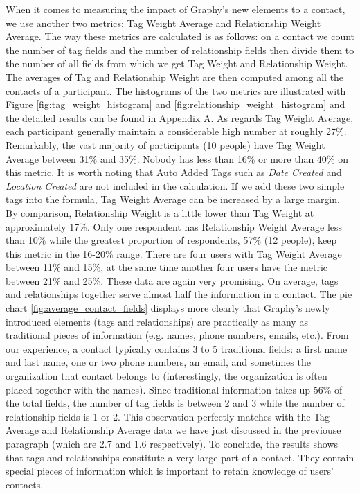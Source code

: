 When it comes to measuring the impact of Graphy's new elements to a contact, we use another two metrics: Tag Weight Average and Relationship Weight Average. The way these metrics are calculated is as follows: on a contact we count the number of tag fields and the number of relationship fields then divide them to the number of all fields from which we get Tag Weight and Relationship Weight. The averages of Tag and Relationship Weight are then computed among all the contacts of a participant. The histograms of the two metrics are illustrated with Figure \ref{fig:tag_weight_histogram} and \ref{fig:relationship_weight_histogram} and the detailed results can be found in Appendix A. As regards Tag Weight Average, each participant generally maintain a considerable high number at roughly 27\%. Remarkably, the vast majority of participants (10 people) have Tag Weight Average between 31\% and 35\%. Nobody has less than 16\% or more than 40\% on this metric. It is worth noting that Auto Added Tags such as \textit{Date Created} and \textit{Location Created} are not included in the calculation. If we add these two simple tags into the formula, Tag Weight Average can be increased by a large margin. By comparison, Relationship Weight is a little lower than Tag Weight at approximately 17\%. Only one respondent has Relationship Weight Average less than 10\% while the greatest proportion of respondents, 57\% (12 people), keep this metric in the 16-20\% range. There are four users with Tag Weight Average between 11\% and 15\%, at the same time another four users have the metric between 21\% and 25\%. These data are again very promising. On average, tags and relationships together serve almost half the information in a contact. The pie chart \ref{fig:average_contact_fields} displays more clearly that Graphy's newly introduced elements (tags and relationships) are practically as many as traditional pieces of information (e.g. names, phone numbers, emails, etc.). From our experience, a contact typically contains 3 to 5 traditional fields: a first name and last name, one or two phone numbers, an email, and sometimes the organization that contact belongs to (interestingly, the organization is often placed together with the names). Since traditional information takes up 56\% of the total fields, the number of tag fields is between 2 and 3 while the number of relationship fields is 1 or 2. This observation perfectly matches with the Tag Average and Relationship Average data we have just discussed in the previouse paragraph (which are 2.7 and 1.6 respectively). To conclude, the results shows that tags and relationships constitute a very large part of a contact. They contain special pieces of information which is important to retain knowledge of users' contacts.

